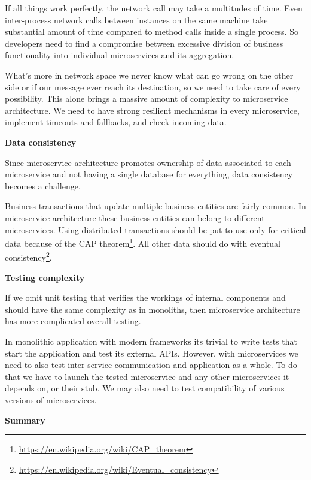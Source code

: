 \documentclass[12pt,oneside]{fithesis2}
\begin{document}
If all things work perfectly, the network call may take a multitudes of time. Even inter-process network calls between instances on the same machine take substantial amount of time compared to method calls inside a single process. So developers need to find a compromise between excessive division of business functionality into individual microservices and its aggregation.

What's more in network space we never know what can go wrong on the other side or if our message ever reach its destination, so we need to take care of every possibility. This alone brings a massive amount of complexity to microservice architecture. We need to have strong resilient mechanisms in every microservice, implement timeouts and fallbacks, and check incoming data.
\bigskip

\noindent\textbf{Data consistency}
\bigskip

Since microservice architecture promotes ownership of data associated to each microservice and not having a single database for everything, data consistency becomes a challenge.

Business transactions that update multiple business entities are fairly common. In microservice architecture these business entities can belong to different microservices. Using distributed transactions should be put to use only for critical data because of the CAP theorem\footnote{\url{https://en.wikipedia.org/wiki/CAP_theorem}}. All other data should do with eventual consistency\footnote{\url{https://en.wikipedia.org/wiki/Eventual_consistency}}.
\bigskip

\noindent\textbf{Testing complexity}
\bigskip

If we omit unit testing that verifies the workings of internal components and should have the same complexity as in monoliths, then microservice architecture has more complicated overall testing.

In monolithic application with modern frameworks its trivial to write tests that start the application and test its external APIs. However, with microservices we need to also test inter-service communication and application as a whole. To do that we have to launch the tested microservice and any other microservices it depends on, or their stub. We may also need to test compatibility of various versions of microservices.
\bigskip

\noindent\textbf{Summary\newline\newline}
\end{document}
